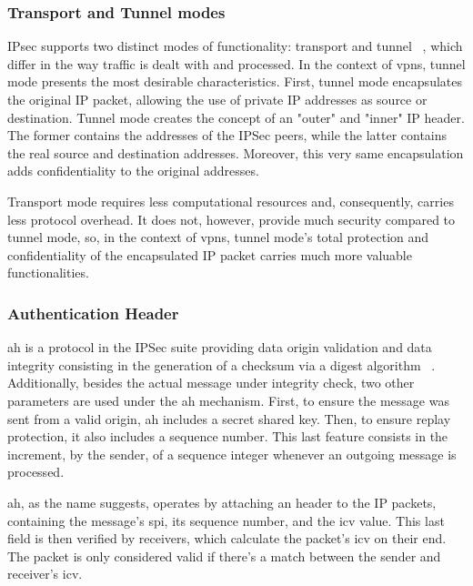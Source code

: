 \documentclass[11pt,twoside,a4paper]{report}
\begin{document}
\subsubsection{Transport and Tunnel modes}

IPsec supports two distinct modes of functionality: transport and tunnel ~\cite{rfc4301}, which differ in the way traffic is dealt with and processed. In the context of \acrshort{vpn}s, tunnel mode presents the
most desirable characteristics. First, tunnel mode encapsulates the original IP packet, allowing the use of private IP addresses as source or destination. Tunnel mode creates the concept of an "outer" and "inner" IP header. The former contains the addresses of the IPSec peers, while the latter contains the real source and destination addresses. Moreover, this very same encapsulation adds confidentiality to the original addresses.

Transport mode requires less computational resources and, consequently, carries less protocol overhead. It does not, however, provide much security compared to tunnel mode, so, in the context of \acrshort{vpn}s, tunnel mode's total protection and confidentiality of the encapsulated IP packet carries much more valuable functionalities.

\subsubsection{Authentication Header}

\acrfull{ah} is a protocol in the IPSec suite providing data origin validation and data integrity consisting in the generation of a checksum via a digest algorithm ~\cite{rfc4302}. Additionally, besides the actual message under integrity check, two other parameters are used under the \acrshort{ah} mechanism. First, to ensure the message was sent from a valid origin, \acrshort{ah} includes a secret shared key. Then, to ensure replay protection, it also includes a sequence number. This last feature consists in the increment, by the sender, of a sequence integer whenever an outgoing message is processed.

\acrshort{ah}, as the name suggests, operates by attaching an header to the IP packets, containing the message's \acrshort{spi}, its sequence number, and the \acrfull{icv} value. This last field is then verified by receivers, which calculate the packet's \acrshort{icv} on their end. The packet is only considered valid if there's a match between the sender and receiver's \acrshort{icv}.
\end{document}

